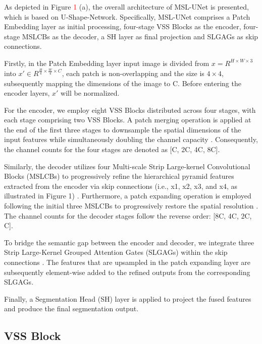 \documentclass[10pt, a4paper, twocolumn]{article}
\begin{document}
As depicted in Figure \textcolor{red}{1} (a), the overall architecture of MSL-UNet is presented, which is based on U-Shape-Network\cite{ronneberger2015unet}. Specifically, MSL-UNet comprises a Patch Embedding layer as initial processing, four-stage VSS Blocks\cite{liu2024vmamba,gu2023mamba} as the encoder, four-stage MSLCBs as the decoder, a SH layer as final projection and SLGAGs as skip connections.

Firstly, in the Patch Embedding layer input image is divided from 
$x=R^{H\times W\times 3} $
into
${x}{'}\in {R}^{\frac{H}{4} \times \frac{W}{4} \times C}$, each patch is non-overlapping and the size is $4 \times 4$, subsequently mapping the dimensions of the image to C. Before entering the encoder layers, ${x}{'}$ will be normalized.

For the encoder, we employ eight VSS Blocks distributed across four stages, with each stage comprising two VSS Blocks. A patch merging operation is applied at the end of the first three stages to downsample the spatial dimensions of the input features while simultaneously doubling the channel capacity \cite{liu2021swin}. Consequently, the channel counts for the four stages are denoted as [C, 2C, 4C, 8C].

Similarly, the decoder utilizes four Multi-scale Strip Large-kernel Convolutional Blocks (MSLCBs) to progressively refine the hierarchical pyramid features extracted from the encoder via skip connections (i.e., x1, x2, x3, and x4, as illustrated in Figure 1) \cite{lin2017feature}. Furthermore, a patch expanding operation is employed following the initial three MSLCBs to progressively restore the spatial resolution \cite{cao2023swin}. The channel counts for the decoder stages follow the reverse order: [8C, 4C, 2C, C].

To bridge the semantic gap between the encoder and decoder, we integrate three Strip Large-Kernel Grouped Attention Gates (SLGAGs) within the skip connections \cite{oktay2018attention}. The features that are upsampled in the patch expanding layer are subsequently element-wise added to the refined outputs from the corresponding SLGAGs.

Finally, a Segmentation Head (SH) layer is applied to project the fused features and produce the final segmentation output.

\subsection{VSS Block}
\end{document}
